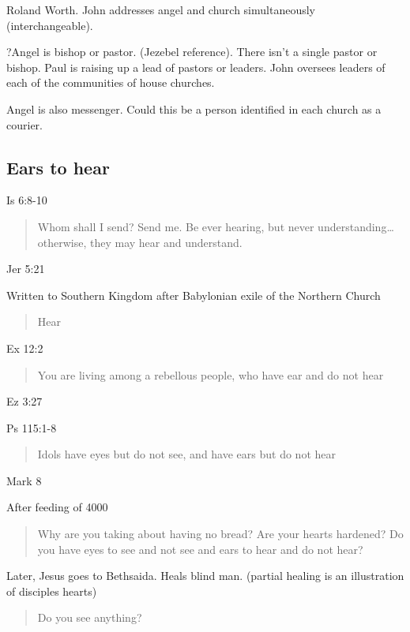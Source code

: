 \documentclass[
]{book}
\begin{document}
Roland Worth. John addresses angel and church simultaneously (interchangeable).

?Angel is bishop or pastor. (Jezebel reference). There isn't a single pastor or bishop. Paul is raising up a lead of pastors or leaders. John oversees leaders of each of the communities of house churches.

Angel is also messenger. Could this be a person identified in each church as a courier.

\hypertarget{ears-to-hear}{%
\subsection{Ears to hear}\label{ears-to-hear}}

Is 6:8-10

\begin{quote}
Whom shall I send? Send me. Be ever hearing, but never understanding\ldots{} otherwise, they may hear and understand.
\end{quote}

Jer 5:21

Written to Southern Kingdom after Babylonian exile of the Northern Church

\begin{quote}
Hear
\end{quote}

Ex 12:2

\begin{quote}
You are living among a rebellous people, who have ear and do not hear
\end{quote}

Ez 3:27

Ps 115:1-8

\begin{quote}
Idols have eyes but do not see, and have ears but do not hear
\end{quote}

Mark 8

After feeding of 4000

\begin{quote}
Why are you taking about having no bread? Are your hearts hardened? Do you have eyes to see and not see and ears to hear and do not hear?
\end{quote}

Later, Jesus goes to Bethsaida. Heals blind man. (partial healing is an illustration of disciples hearts)

\begin{quote}
Do you see anything?
\end{quote}
\end{document}
